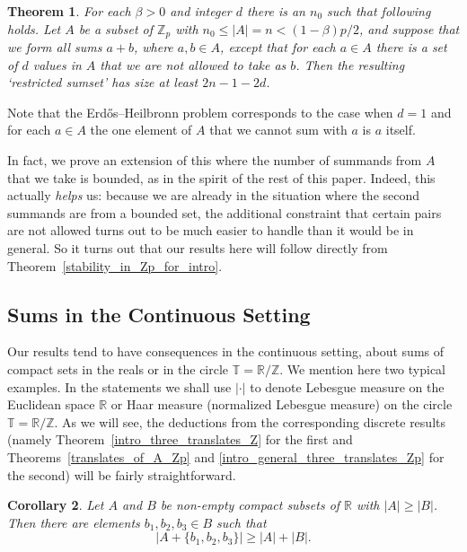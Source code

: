 \documentclass[12pt,reqno]{amsart}
\newtheorem{theorem}{Theorem}
\newtheorem{corollary}[theorem]{Corollary}
\theoremstyle{definition}
\renewcommand\le{\leqslant}
\renewcommand\ge{\geqslant}
\begin{document}
\begin{theorem}\label{EH_for_intro}
  For each $\beta>0$ and integer $d$ there is an $n_0$ such that following holds. Let $A$ be a subset of $\mathbb{Z}_p$ with
  $n_0 \le |A|=n < (1-\beta)p/2$, and suppose that we form all sums $a+b$, where $a,b \in A$, except that for
  each $a \in A$ there is a set of $d$ values in $A$ that we are not allowed to take as $b$. Then the resulting `restricted sumset' has
  size at least $2n-1-2d$.
\end{theorem}

\vspace{5pt}
Note that the Erd\H{o}s--Heilbronn problem corresponds to the case when $d=1$ and for each $a \in A$ the one
element of $A$ that we cannot sum with $a$ is $a$ itself.

\vspace{5pt}
In fact, we prove an extension of this where the number of summands from $A$ that we take is bounded, as in the spirit of the rest of this paper.
Indeed, this actually {\it helps} us: because we are already in the situation where the second summands are
from a bounded set, the additional constraint that certain pairs are not allowed turns out to be much easier to
handle than it would be in general. So it turns out that our results here will follow directly from
Theorem~\ref{stability_in_Zp_for_intro}.

\vspace{10pt}

\subsection{Sums in the Continuous Setting}
Our results tend to have consequences in the continuous setting, about sums of compact sets in the reals or
in the circle $\mathbb{T}=\mathbb{R}/\mathbb{Z}$.
We mention here two typical examples. In the statements we shall use $|\cdot|$ to denote Lebesgue measure on the Euclidean space $\mathbb{R}$ or Haar measure (normalized Lebesgue measure) on the circle $\mathbb{T}=\mathbb{R}/\mathbb{Z}$. As we will
see, the deductions from the corresponding discrete results (namely Theorem~\ref{intro_three_translates_Z} for the first and Theorems~\ref{translates_of_A_Zp}
and \ref{intro_general_three_translates_Zp} for the second) 
will be fairly straightforward.

\begin{corollary}\label{cont_intro_three_translates_Z}
Let $A$ and $B$ be non-empty compact subsets of $\mathbb{R}$ with $|A| \ge |B|$. Then there are elements
$b_1,b_2,b_3 \in B$ such that
$$|A+\{b_1,b_2,b_3\}| \ge |A|+|B|.$$
\end{corollary}
\end{document}
